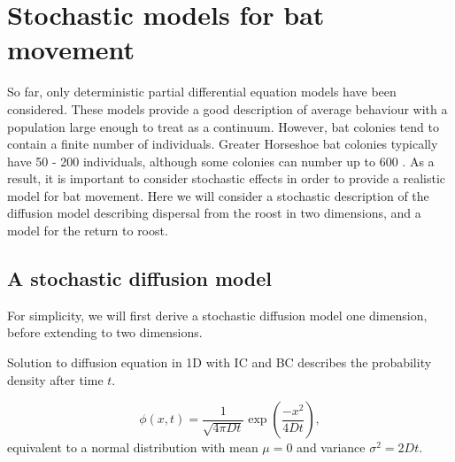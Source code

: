 
\chapter{Stochastic models for bat movement}

So far, only deterministic partial differential equation models have been
considered. These models provide a good description of average behaviour with a
population large enough to treat as a continuum. However, bat colonies tend to
contain a finite number of individuals. Greater Horseshoe bat colonies typically
have 50 - 200 individuals, although some colonies can number up to 600
\cite{greenaway1990field}. As a result, it is important to consider stochastic
effects in order to provide a realistic model for bat movement. Here we will
consider a stochastic description of the diffusion model describing dispersal
from the roost in two dimensions, and a model for the return to roost.

	\section{A stochastic diffusion model}

	For simplicity, we will first derive a stochastic diffusion model one
	dimension, before extending to two dimensions.

	Solution to diffusion equation in 1D with IC and BC describes the probability
	density after time $t$.

	\begin{equation}
\phi(x,t) = \frac{1}{\sqrt{4\pi Dt}}\exp \left(\frac{-x^2}{4Dt} \right) ,
\label{eqn:diffusion_solution1d}
	\end{equation}
%
equivalent to a normal distribution with mean $\mu = 0$ and variance $\sigma^2 =
2Dt$.

